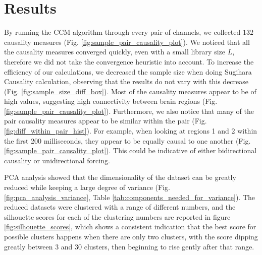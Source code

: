 \documentclass[journal,12pt,onecolumn,draftclsnofoot]{IEEEtran}  %
\begin{document}



\section{Results}
By running the CCM algorithm through every pair of channels, we collected $132$ causality measures (Fig. \ref{fig:sample_pair_causality_plot}). We noticed that all the causality measures converged quickly, even with a small library size $L$, therefore we did not take the convergence heuristic into account. To increase the efficiency of our calculations, we decreased the sample size when doing Sugihara Causality calculation, observing that the results do not vary with this decrease (Fig. \ref{fig:sample_size_diff_box}). Most of the causality measures appear to be of high values, suggesting high connectivity between brain regions (Fig. \ref{fig:sample_pair_causality_plot}). Furthermore, we also notice that many of the pair causality measures appear to be similar within the pair (Fig. \ref{fig:diff_within_pair_hist}). For example, when looking at regions 1 and 2 within the first 200 milliseconds, they appear to be equally causal to one another (Fig. \ref{fig:sample_pair_causality_plot}). This could be indicative of either bidirectional causality or unidirectional forcing.

PCA analysis showed that the dimensionality of the dataset can be greatly reduced while keeping a large degree of variance (Fig. \ref{fig:pca_analysis_variance}, Table \ref{tab:components_needed_for_variance}). The reduced datasets were clustered with a range of different numbers, and the silhouette scores for each of the clustering numbers are reported in figure \ref{fig:silhouette_scores}, which shows a consistent indication that the best score for possible clusters happens when there are only two clusters, with the score dipping greatly between 3 and 30 clusters, then beginning to rise gently after that range. 
\end{document}
